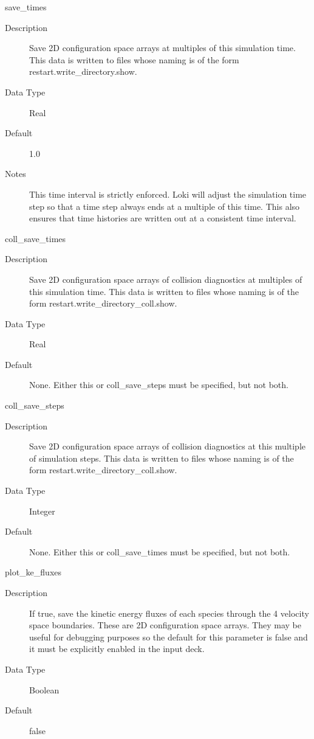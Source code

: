 \documentclass[11pt]{amsart}
\begin{document}
save\_times
\begin{description}
\item [Description] Save 2D configuration space arrays at multiples of this
simulation time.  This data is written to files whose naming is of the form
restart.write\_directory.show.
\item [Data Type] Real
\item [Default] 1.0
\item [Notes] This time interval is strictly enforced.  Loki will adjust the
simulation time step so that a time step always ends at a multiple of this
time.  This also ensures that time histories are written out at a consistent
time interval.
\end{description}

coll\_save\_times
\begin{description}
\item [Description] Save 2D configuration space arrays of collision diagnostics
at multiples of this simulation time.  This data is written to files whose
naming is of the form restart.write\_directory\_coll.show.
\item [Data Type] Real
\item [Default] None.  Either this or coll\_save\_steps must be specified, but
not both.
\end{description}

coll\_save\_steps
\begin{description}
\item [Description] Save 2D configuration space arrays of collision diagnostics
at this multiple of simulation steps.  This data is written to files whose
naming is of the form restart.write\_directory\_coll.show.
\item [Data Type] Integer
\item [Default] None.  Either this or coll\_save\_times must be specified, but
not both.
\end{description}

plot\_ke\_fluxes
\begin{description}
\item [Description] If true, save the kinetic energy fluxes of each species
through the 4 velocity space boundaries.  These are 2D configuration space
arrays.  They may be useful for debugging purposes so the default for this
parameter is false and it must be explicitly enabled in the input deck.
\item [Data Type] Boolean
\item [Default] false
\end{description}
\end{document}
